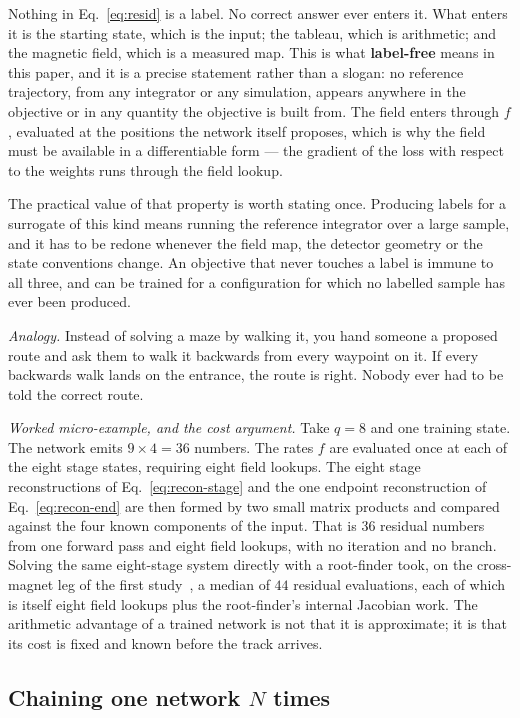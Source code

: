 \documentclass[11pt,a4paper]{article}
\begin{document}
Nothing in Eq.~\eqref{eq:resid} is a label. No correct answer ever enters it.
What enters it is the starting state, which is the input; the tableau, which is
arithmetic; and the magnetic field, which is a measured map. This is what
\textbf{label-free} means in this paper, and it is a precise statement rather
than a slogan: no reference trajectory, from any integrator or any simulation,
appears anywhere in the objective or in any quantity the objective is built
from. The field enters through $f$, evaluated at the positions the network
itself proposes, which is why the field must be available in a differentiable
form --- the gradient of the loss with respect to the weights runs through the
field lookup.

The practical value of that property is worth stating once. Producing labels
for a surrogate of this kind means running the reference integrator over a
large sample, and it has to be redone whenever the field map, the detector
geometry or the state conventions change. An objective that never touches a
label is immune to all three, and can be trained for a configuration for which
no labelled sample has ever been produced.

\emph{Analogy.} Instead of solving a maze by walking it, you hand someone a
proposed route and ask them to walk it backwards from every waypoint on it. If
every backwards walk lands on the entrance, the route is right. Nobody ever had
to be told the correct route.

\emph{Worked micro-example, and the cost argument.} Take $q = 8$ and one
training state. The network emits $9 \times 4 = 36$ numbers. The rates $f$ are
evaluated once at each of the eight stage states, requiring eight field
lookups. The eight stage reconstructions of Eq.~\eqref{eq:recon-stage} and the
one endpoint reconstruction of Eq.~\eqref{eq:recon-end} are then formed by two
small matrix products and compared against the four known components of the
input. That is $36$ residual numbers from one forward pass and eight field
lookups, with no iteration and no branch. Solving the same eight-stage system
directly with a root-finder took, on the cross-magnet leg of the first
study~\citep{scriven2026lhcb1}, a median of $44$ residual evaluations, each of
which is itself eight field lookups plus the root-finder's internal Jacobian
work. The arithmetic advantage of a trained network is not that it is
approximate; it is that its cost is fixed and known before the track arrives.

\subsection{Chaining one network \texorpdfstring{$N$}{N} times}
\label{sec:theory-chaining}
\end{document}
